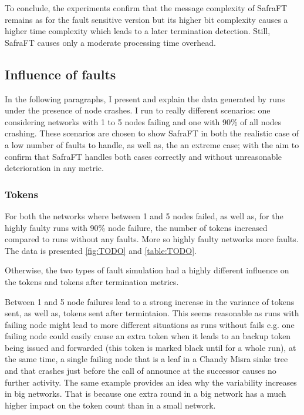To conclude, the experiments confirm that the message complexity of SafraFT remains as for the fault sensitive version but its higher bit complexity causes a higher time complexity which leads to a later termination detection. 
Still, SafraFT causes only a moderate processing time overhead.

\subsection{Influence of faults}
In the following paragraphs, I present and explain the data generated by runs under the presence of node crashes.
I run to really different scenarios: one considering networks with 1 to 5 nodes failing and one with 90\% of all nodes crashing.
These scenarios are chosen to show SafraFT in both the realistic case of a low number of faults to handle, as well as, the an extreme case; with the aim to confirm that SafraFT handles both cases correctly and
without unreasonable deterioration in any metric.

\subsubsection{Tokens}
For both the networks where between 1 and 5 nodes failed, as well as, for the highly faulty runs with 90\% node failure, the number of tokens increased compared to runs without any faults.
More so highly faulty networks more faults. The data is presented \cref{fig:TODO} and \cref{table:TODO}. %

Otherwise, the two types of fault simulation had a highly different influence on the tokens and tokens after termination metrics.

Between 1 and 5 node failures lead to a strong increase in the variance of tokens sent, as well as, tokens sent after termintaion.
This seems reasonable as runs with failing node might lead to more different situations as runs without fails e.g. one failing node could easily cause an extra token when it leads to an backup token being issued and forwarded (this token is marked black until for a whole run), at the same time, a single failing node that is a leaf in a Chandy Misra sinke tree and that crashes just before the call of announce at the successor  causes no further activity.
The same example provides an idea why the variability increases in big networks. 
That is because one extra round in a big network has a much higher impact on the token count than in a small network.

